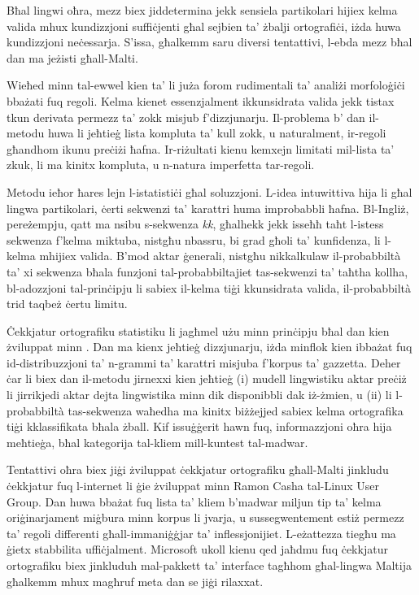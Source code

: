 \documentclass[]{../../metanetpaper}
\begin{document}
\begin{multicols}{2}
Bħal lingwi oħra, mezz biex jiddetermina jekk sensiela partikolari hijiex kelma valida mhux kundizzjoni suffiċjenti għal sejbien ta’ żbalji ortografiċi, iżda huwa kundizzjoni neċessarja. S’issa, għalkemm saru diversi tentattivi, l-ebda mezz bħal dan ma jeżisti għall-Malti.

Wieħed minn tal-ewwel kien ta’ \cite{Mangion:1999} li juża forom rudimentali ta’ analiżi morfoloġiċi bbażati fuq regoli. Kelma kienet essenzjalment ikkunsidrata valida jekk tistax tkun derivata permezz ta' zokk misjub f’dizzjunarju. Il-problema b’ dan il-metodu huwa li jeħtieġ lista kompluta ta’ kull zokk, u naturalment, ir-regoli għandhom ikunu preċiżi ħafna. Ir-riżultati kienu kemxejn limitati mil-lista ta’ zkuk, li ma kinitx kompluta, u n-natura imperfetta tar-regoli.

Metodu ieħor ħares lejn l-istatistiċi għal soluzzjoni. L-idea intuwittiva hija li għal lingwa partikolari, ċerti sekwenzi ta’ karattri huma improbabbli ħafna. Bl-Ingliż, pereżempju, qatt ma nsibu s-sekwenza \emph{kk}, għalhekk jekk isseħħ taħt l-istess sekwenza f’kelma miktuba, nistgħu nbassru, bi grad għoli ta’ kunfidenza, li l-kelma mhijiex valida. B’mod aktar ġenerali, nistgħu nikkalkulaw il-probabbiltà ta’ xi sekwenza bħala funzjoni tal-probabbiltajiet tas-sekwenzi ta’ taħtha kollha, bl-adozzjoni tal-prinċipju li sabiex il-kelma tiġi kkunsidrata valida, il-probabbiltà trid taqbeż ċertu limitu.

Ċekkjatur ortografiku statistiku li jagħmel użu minn prinċipju bħal dan kien żviluppat minn \cite{Mizzi:2000}. Dan ma kienx jeħtieġ dizzjunarju, iżda minflok kien ibbażat fuq id-distribuzzjoni ta’ n-grammi ta' karattri misjuba f’korpus ta’ gazzetta. Deher ċar li biex dan il-metodu jirnexxi kien jeħtieġ (i) mudell lingwistiku aktar preċiż li jirrikjedi aktar dejta lingwistika minn dik disponibbli dak iż-żmien, u (ii) li l-probabbiltà tas-sekwenza waħedha ma kinitx biżżejjed sabiex kelma ortografika tiġi kklassifikata bħala żball. Kif issuġġerit hawn fuq, informazzjoni oħra hija meħtieġa, bħal kategorija tal-kliem mill-kuntest tal-madwar.

Tentattivi oħra biex jiġi żviluppat ċekkjatur ortografiku għall-Malti jinkludu ċekkjatur fuq l-internet li ġie żviluppat minn Ramon Casha tal-Linux User Group\cite{Linux-spellcheck1}. Dan huwa bbażat fuq lista ta’ kliem b’madwar miljun tip ta’ kelma oriġinarjament miġbura minn korpus li jvarja, u sussegwentement estiż permezz ta’ regoli differenti għall-immaniġġjar ta’ inflessjonijiet. L-eżattezza tiegħu ma ġietx stabbilita uffiċjalment. Microsoft ukoll kienu qed jaħdmu fuq ċekkjatur ortografiku biex jinkluduh mal-pakkett ta’ interface tagħhom għal-lingwa Maltija għalkemm mhux magħruf meta dan se jiġi rilaxxat.


\end{multicols}
\end{document}
